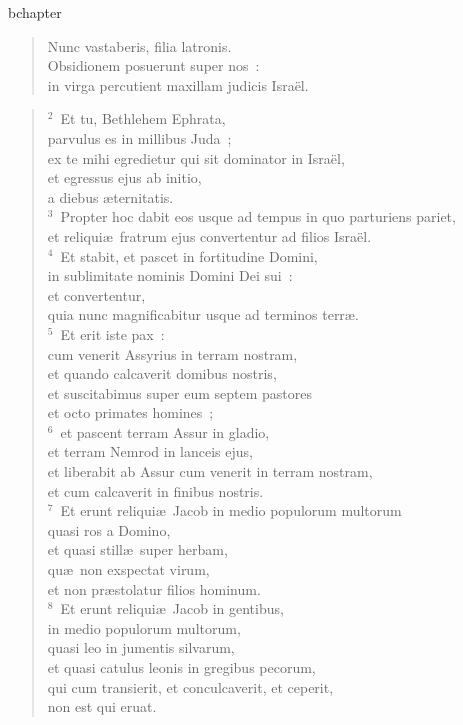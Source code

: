bchapter\begin{verse}\vspace{-19pt}Nunc vastaberis, filia latronis.\\ Obsidionem posuerunt super nos~:\\ in virga percutient maxillam judicis Isra\"el.\end{verse}


\begin{verse}${}^{2}$~Et tu, Bethlehem Ephrata,\\ parvulus es in millibus Juda~;\\ ex te mihi egredietur qui sit dominator in Isra\"el,\\ et egressus ejus ab initio,\\ a diebus \ae ternitatis.\\
${}^{3}$~Propter hoc dabit eos usque ad tempus in quo parturiens pariet,\\ et reliqui\ae\ fratrum ejus convertentur ad filios Isra\"el.\\
${}^{4}$~Et stabit, et pascet in fortitudine Domini,\\ in sublimitate nominis Domini Dei sui~:\\ et convertentur,\\ quia nunc magnificabitur usque ad terminos terr\ae .\\
${}^{5}$~Et erit iste pax~:\\ cum venerit Assyrius in terram nostram,\\ et quando calcaverit domibus nostris,\\ et suscitabimus super eum septem pastores\\ et octo primates homines~;\\
${}^{6}$~et pascent terram Assur in gladio,\\ et terram Nemrod in lanceis ejus,\\ et liberabit ab Assur cum venerit in terram nostram,\\ et cum calcaverit in finibus nostris.\\
${}^{7}$~Et erunt reliqui\ae\ Jacob in medio populorum multorum\\ quasi ros a Domino,\\ et quasi still\ae\ super herbam,\\ qu\ae\ non exspectat virum,\\ et non pr\ae stolatur filios hominum.\\
${}^{8}$~Et erunt reliqui\ae\ Jacob in gentibus,\\ in medio populorum multorum,\\ quasi leo in jumentis silvarum,\\ et quasi catulus leonis in gregibus pecorum,\\ qui cum transierit, et conculcaverit, et ceperit,\\ non est qui eruat.\\

\end{verse}
